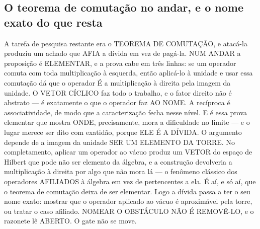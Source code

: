 \documentclass[11pt]{article}
\theoremstyle{definition}\newtheorem{deriv}{Derivação}
\begin{document}
\subsection*{O teorema de comuta\c{c}\~ao no andar, e o nome exato do que resta}A tarefa de pesquisa restante era o TEOREMA DE COMUTA\c{C}\~AO, e atac\'a-la produziu um achado que AFIA a d\'ivida em vez de pag\'a-la. NUM ANDAR a proposi\c{c}\~ao \'e ELEMENTAR, e a prova cabe em tr\^es linhas: se um operador comuta com toda multiplica\c{c}\~ao \`a esquerda, ent\~ao aplic\'a-lo \`a unidade e usar essa comuta\c{c}\~ao d\'a que o operador \'E a multiplica\c{c}\~ao \`a direita pela imagem da unidade. O VETOR C\'ICLICO faz todo o trabalho, e o fator direito n\~ao \'e abstrato --- \'e exatamente o que o operador faz AO NOME. A rec\'iproca \'e associatividade, de modo que a caracteriza\c{c}\~ao fecha nesse n\'ivel. E \'e essa prova elementar que mostra ONDE, precisamente, mora a dificuldade no limite --- e o lugar merece ser dito com exatid\~ao, porque ELE \'E A D\'IVIDA. O argumento depende de a imagem da unidade SER UM ELEMENTO DA TORRE. No completamento, aplicar um operador ao v\'acuo produz um VETOR do espa\c{c}o de Hilbert que pode n\~ao ser elemento da \'algebra, e a constru\c{c}\~ao devolveria a multiplica\c{c}\~ao \`a direita por algo que n\~ao mora l\'a --- o fen\^omeno cl\'assico dos operadores AFILIADOS \`a \'algebra em vez de pertencentes a ela. \'E a\'i, e s\'o a\'i, que o teorema de comuta\c{c}\~ao deixa de ser elementar. Logo a d\'ivida passa a ter o seu nome exato: mostrar que o operador aplicado ao v\'acuo \'e aproxim\'avel pela torre, ou tratar o caso afiliado. NOMEAR O OBST\'ACULO N\~AO \'E REMOV\^E-LO, e o razonete l\^e ABERTO. O gate n\~ao se move.
\end{document}
